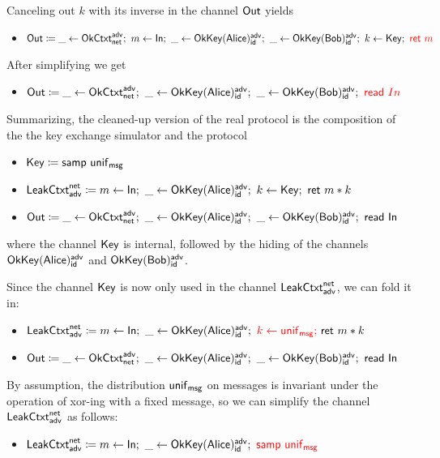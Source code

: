 \noindent Canceling out $k$ with its inverse in the channel $\Out$ yields
\begin{itemize}
\item $\Out \coloneqq \_ \leftarrow \OkCtxt^\adv_\net; \ m \leftarrow \In; \ \_ \leftarrow \OkKey(\Alice)^\adv_\id; \ \_ \leftarrow \OkKey(\Bob)^\adv_\id; \ k \leftarrow \Key; \ {\color{red} \ret{m}}$
\end{itemize}
After simplifying we get
\begin{itemize}
\item $\Out \coloneqq \_ \leftarrow \OkCtxt^\adv_\net; \ \_ \leftarrow \OkKey(\Alice)^\adv_\id; \ \_ \leftarrow \OkKey(\Bob)^\adv_\id; \ {\color{red} \read{In}}$
\end{itemize}

\noindent Summarizing, the cleaned-up version of the real protocol is the composition of the the key exchange simulator and the protocol
\begin{itemize}
\item $\Key \coloneqq \samp{\unif_\msg}$
\item $\LeakCtxt^\net_\adv \coloneqq m \leftarrow \In; \ \_ \leftarrow \OkKey(\Alice)^\adv_\id; \ k \leftarrow \Key; \ \ret{m * k}$
\item $\Out \coloneqq \_ \leftarrow \OkCtxt^\adv_\net; \ \_ \leftarrow \OkKey(\Alice)^\adv_\id; \ \_ \leftarrow \OkKey(\Bob)^\adv_\id; \ \read{\In}$
\end{itemize}
where the channel $\Key$ is internal, followed by the hiding of the channels $\OkKey(\Alice)^\adv_\id$ and $\OkKey(\Bob)^\adv_\id$.

Since the channel $\Key$ is now only used in the channel $\LeakCtxt^\net_\adv$, we can fold it in:
\begin{itemize}
\item $\LeakCtxt^\net_\adv \coloneqq m \leftarrow \In; \ \_ \leftarrow \OkKey(\Alice)^\adv_\id; \ {\color{red} k \leftarrow \unif_\msg; \ } \ret{m * k}$
\item $\Out \coloneqq \_ \leftarrow \OkCtxt^\adv_\net; \ \_ \leftarrow \OkKey(\Alice)^\adv_\id; \ \_ \leftarrow \OkKey(\Bob)^\adv_\id; \ \read{\In}$
\end{itemize}

\noindent By assumption, the distribution $\unif_\msg$ on messages is invariant under the operation of xor-ing with a fixed message, so we can simplify the channel $\LeakCtxt^\net_\adv$ as follows:
\begin{itemize}
\item $\LeakCtxt^\net_\adv \coloneqq m \leftarrow \In; \ \_ \leftarrow \OkKey(\Alice)^\adv_\id; \ {\color{red} \samp{\unif_\msg}}$
\end{itemize}

